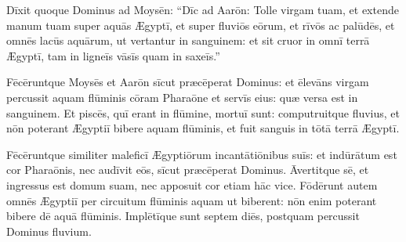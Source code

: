 Dīxit quoque Dominus ad
Moysēn: ``Dīc ad Aarōn: Tolle virgam tuam, et extende manum tuam super
aquās Ægyptī, et super fluviōs eōrum, et rīvōs ac palūdēs, et omnēs
lacūs aquārum, ut vertantur in sanguinem: et sit cruor in omnī terrā
Ægyptī, tam in ligneīs vāsīs quam in saxeīs.''

Fēcēruntque Moysēs et
Aarōn sīcut præcēperat Dominus: et ēlevāns virgam percussit aquam
flūminis cōram Pharaōne et servīs eius: quæ versa est in sanguinem. 
Et piscēs, quī erant in flūmine, mortuī sunt: computruitque fluvius, et
nōn poterant Ægyptiī bibere aquam flūminis, et fuit sanguis in tōtā
terrā Ægyptī. 

Fēcēruntque similiter maleficī Ægyptiōrum
incantātiōnibus suīs: et indūrātum est cor Pharaōnis, nec audīvit eōs,
sīcut præcēperat Dominus. Āvertitque sē, et ingressus est domum suam,
nec apposuit cor etiam hāc vice. Fōdērunt autem omnēs Ægyptiī per
circuitum flūminis aquam ut biberent: nōn enim poterant bibere dē aquā
flūminis. Implētīque sunt septem diēs, postquam percussit Dominus
fluvium.

